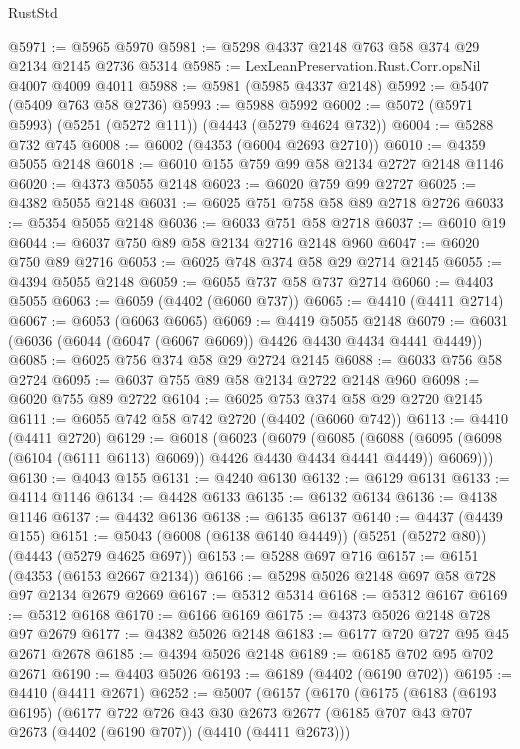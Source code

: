 \begin{lexlean}{RustStd}
\begin{coremodule}
@5971 := @5965 @5970
@5981 := @5298 @4337 @2148 @763 @58 @374 @29 @2134 @2145 @2736 @5314
@5985 := LexLeanPreservation.Rust.Corr.opsNil @4007 @4009 @4011
@5988 := @5981 (@5985 @4337 @2148)
@5992 := @5407 (@5409 @763 @58 @2736)
@5993 := @5988 @5992
@6002 := @5072 (@5971 @5993) (@5251 (@5272 @111)) (@4443 (@5279 @4624 @732))
@6004 := @5288 @732 @745
@6008 := @6002 (@4353 (@6004 @2693 @2710))
@6010 := @4359 @5055 @2148
@6018 := @6010 @155 @759 @99 @58 @2134 @2727 @2148 @1146
@6020 := @4373 @5055 @2148
@6023 := @6020 @759 @99 @2727
@6025 := @4382 @5055 @2148
@6031 := @6025 @751 @758 @58 @89 @2718 @2726
@6033 := @5354 @5055 @2148
@6036 := @6033 @751 @58 @2718
@6037 := @6010 @19
@6044 := @6037 @750 @89 @58 @2134 @2716 @2148 @960
@6047 := @6020 @750 @89 @2716
@6053 := @6025 @748 @374 @58 @29 @2714 @2145
@6055 := @4394 @5055 @2148
@6059 := @6055 @737 @58 @737 @2714
@6060 := @4403 @5055
@6063 := @6059 (@4402 (@6060 @737))
@6065 := @4410 (@4411 @2714)
@6067 := @6053 (@6063 @6065)
@6069 := @4419 @5055 @2148
@6079 := @6031 (@6036 (@6044 (@6047 (@6067 @6069)) @4426 @4430 @4434 @4441 @4449))
@6085 := @6025 @756 @374 @58 @29 @2724 @2145
@6088 := @6033 @756 @58 @2724
@6095 := @6037 @755 @89 @58 @2134 @2722 @2148 @960
@6098 := @6020 @755 @89 @2722
@6104 := @6025 @753 @374 @58 @29 @2720 @2145
@6111 := @6055 @742 @58 @742 @2720 (@4402 (@6060 @742))
@6113 := @4410 (@4411 @2720)
@6129 := @6018
    (@6023
      (@6079
        (@6085
          (@6088 (@6095 (@6098 (@6104 (@6111 @6113) @6069)) @4426 @4430 @4434 @4441 @4449))
          @6069)))
@6130 := @4043 @155
@6131 := @4240 @6130
@6132 := @6129 @6131
@6133 := @4114 @1146
@6134 := @4428 @6133
@6135 := @6132 @6134
@6136 := @4138 @1146
@6137 := @4432 @6136
@6138 := @6135 @6137
@6140 := @4437 (@4439 @155)
@6151 := @5043 (@6008 (@6138 @6140 @4449)) (@5251 (@5272 @80)) (@4443 (@5279 @4625 @697))
@6153 := @5288 @697 @716
@6157 := @6151 (@4353 (@6153 @2667 @2134))
@6166 := @5298 @5026 @2148 @697 @58 @728 @97 @2134 @2679 @2669
@6167 := @5312 @5314
@6168 := @5312 @6167
@6169 := @5312 @6168
@6170 := @6166 @6169
@6175 := @4373 @5026 @2148 @728 @97 @2679
@6177 := @4382 @5026 @2148
@6183 := @6177 @720 @727 @95 @45 @2671 @2678
@6185 := @4394 @5026 @2148
@6189 := @6185 @702 @95 @702 @2671
@6190 := @4403 @5026
@6193 := @6189 (@4402 (@6190 @702))
@6195 := @4410 (@4411 @2671)
@6252 := @5007
    (@6157
      (@6170
        (@6175
          (@6183
            (@6193 @6195)
            (@6177
              @722
              @726
              @43
              @30
              @2673
              @2677
              (@6185 @707 @43 @707 @2673 (@4402 (@6190 @707)) (@4410 (@4411 @2673)))

\end{coremodule}
\end{lexlean}
